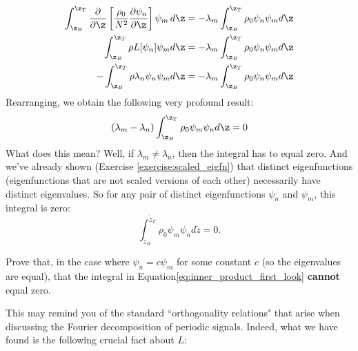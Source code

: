 \begin{align}
  \int_{\z_B}^{\z_T}\frac{\partial}{\partial \z}\left[\frac{\rho_0}{N^2}\frac{\partial\psi_n}{\partial\z}\right]\psi_m\,d\z &= -\lambda_m\int_{\z_B}^{\z_T}\rho_0\psi_n\psi_m d\z \\
  \int_{\z_B}^{\z_T}\rho L[\psi_n]\psi_m d\z &= -\lambda_m\int_{\z_B}^{\z_T}\rho_0\psi_n\psi_m d\z\\
  -\int_{\z_B}^{\z_T}\rho \lambda_n\psi_n\psi_m d\z &= -\lambda_m\int_{\z_B}^{\z_T}\rho_0\psi_n\psi_m d\z\\
\end{align}
Rearranging, we obtain the following very profound result:
\begin{equation}
  \label{eq:profound}
  (\lambda_m-\lambda_n)\int_{\z_B}^{\z_T}\rho_0\psi_m\psi_n d\z = 0
\end{equation}
What does this mean? Well, if $\lambda_m\neq\lambda_n$, then the integral has to equal zero. And we've already shown (Exercise \ref{exercise:scaled_eigfn}) that distinct eigenfunctions (eigenfunctions that are not scaled versions of each other) necessarily have distinct eigenvalues. So for any pair of distinct eigenfunctions $\psi_n$ and $\psi_m$, this integral is zero:
\begin{equation}
  \label{eq:inner_product_first_look}
  \int_{\tilde z_B}^{\tilde z_T} \rho_0\psi_m\psi_n d\tilde z = 0.
\end{equation}


\begin{exercise}
  Prove that, in the case where $\psi_n=c\psi_m$ for some constant $c$ (so the eigenvalues are equal), that the integral in Equation\ref{eq:inner_product_first_look} \textbf{cannot} equal zero. 
\end{exercise}
This may remind you of the standard ``orthogonality relations" that arise when discussing the Fourier decomposition of periodic signals. Indeed, what we have found is the following crucial fact about $L$:

